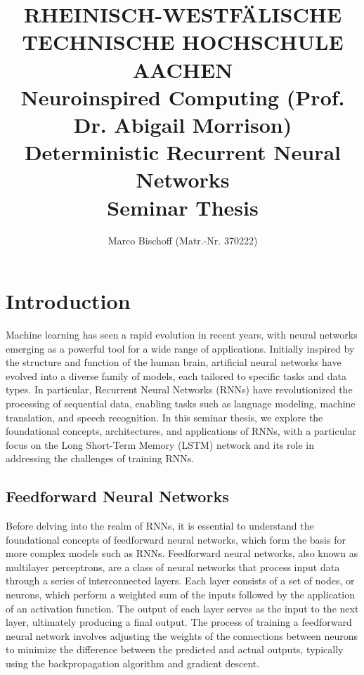 \documentclass{article}
\title{
  {\bf \scriptsize
    RHEINISCH-WESTF\"ALISCHE TECHNISCHE HOCHSCHULE AACHEN \\
    Neuroinspired Computing (Prof. Dr. Abigail Morrison)
  } \vspace{2cm} \\
  Deterministic Recurrent Neural Networks \\
  {\large Seminar Thesis} 
}
\author{Marco Bischoff (Matr.-Nr. 370222)}
\begin{document}
\pagestyle{headings}

\maketitle
\newpage

\tableofcontents
\newpage



\section{Introduction}
\label{ch:1}

Machine learning has seen a rapid evolution in recent years, with neural networks emerging
as a powerful tool for a wide range of applications. Initially inspired by the structure
and function of the human brain, artificial neural networks have evolved into a diverse
family of models, each tailored to specific tasks and data types. In particular, Recurrent
Neural Networks (RNNs) have revolutionized the processing of sequential data, enabling
tasks such as language modeling, machine translation, and speech recognition. In this
seminar thesis, we explore the foundational concepts, architectures, and applications of
RNNs, with a particular focus on the Long Short-Term Memory (LSTM) network and its role in
addressing the challenges of training RNNs.


\subsection{Feedforward Neural Networks}
\label{sec:1.0}

Before delving into the realm of RNNs, it is essential to understand the foundational
concepts of feedforward neural networks, which form the basis for more complex models such
as RNNs. Feedforward neural networks, also known as multilayer perceptrons, are a class of
neural networks that process input data through a series of interconnected layers. Each
layer consists of a set of nodes, or neurons, which perform a weighted sum of the inputs
followed by the application of an activation function. The output of each layer serves as
the input to the next layer, ultimately producing a final output. The process of training
a feedforward neural network involves adjusting the weights of the connections between
neurons to minimize the difference between the predicted and actual outputs, typically
using the backpropagation algorithm and gradient descent.
\end{document}

